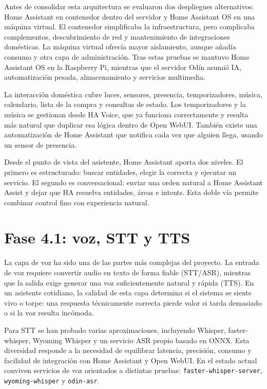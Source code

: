 Antes de consolidar esta arquitectura se evaluaron dos despliegues alternativos: Home Assistant en contenedor dentro del servidor y Home Assistant OS en una máquina virtual. El contenedor simplificaba la infraestructura, pero complicaba complementos, descubrimiento de red y mantenimiento de integraciones domésticas. La máquina virtual ofrecía mayor aislamiento, aunque añadía consumo y otra capa de administración. Tras estas pruebas se mantuvo Home Assistant OS en la Raspberry Pi, mientras que el servidor Odín asumió IA, automatización pesada, almacenamiento y servicios multimedia.

La interacción doméstica cubre luces, sensores, presencia, temporizadores, música, calendario, lista de la compra y consultas de estado. Los temporizadores y la música se gestionan desde HA Voice, que ya funciona correctamente y resulta más natural que duplicar esa lógica dentro de Open WebUI. También existe una automatización de Home Assistant que notifica cada vez que alguien llega, usando un sensor de presencia.

Desde el punto de vista del asistente, Home Assistant aporta dos niveles. El primero es estructurado: buscar entidades, elegir la correcta y ejecutar un servicio. El segundo es conversacional: enviar una orden natural a Home Assistant Assist y dejar que HA resuelva entidades, áreas e intents. Esta doble vía permite combinar control fino con experiencia natural.

\section{Fase 4.1: voz, STT y TTS}
La capa de voz ha sido una de las partes más complejas del proyecto. La entrada de voz requiere convertir audio en texto de forma fiable (STT/ASR), mientras que la salida exige generar una voz suficientemente natural y rápida (TTS). En un asistente cotidiano, la calidad de esta capa determina si el sistema se siente vivo o torpe: una respuesta técnicamente correcta pierde valor si tarda demasiado o si la voz resulta incómoda.

Para STT se han probado varias aproximaciones, incluyendo Whisper, faster-whisper, Wyoming Whisper y un servicio ASR propio basado en ONNX. Esta diversidad responde a la necesidad de equilibrar latencia, precisión, consumo y facilidad de integración con Home Assistant y Open WebUI. En el estado actual conviven servicios de voz orientados a distintas pruebas: \texttt{faster-whisper-server}, \texttt{wyoming-whisper} y \texttt{odin-asr}.

